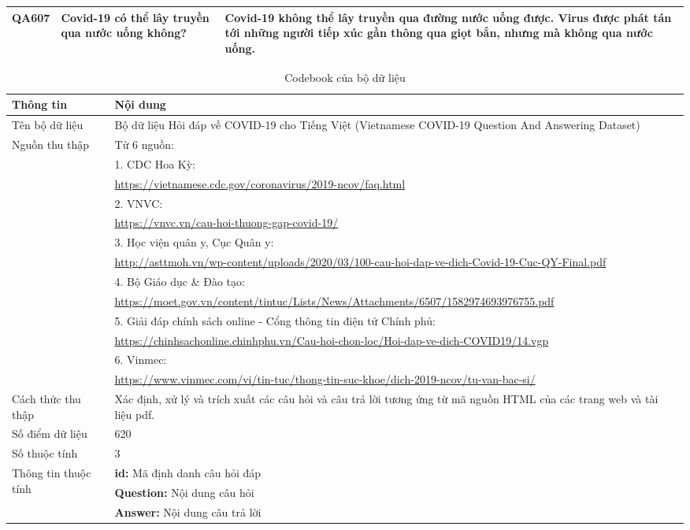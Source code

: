 \documentclass[runningheads]{llncs}
\begin{document}
\begin{table}
\begin{center}
\begin{tabular}{ | p{1.25cm} | p{5cm} | p{5cm} |}
			\hline
			QA607& Covid-19 có thể lây truyền qua nước uống không? &Covid-19 không thể lây truyền qua đường nước uống được. Virus được phát tán tới những người tiếp xúc gần thông qua giọt bắn, nhưng mà không qua nước uống.\\
			\hline
			\end{tabular}
		\end{center}
\end{table}
\begin{table}[H]
	\setlength{\tabcolsep}{0.5em}
	\renewcommand{\arraystretch}{1.4}
	\begin{center}
	\caption{Codebook của bộ dữ liệu}\label{tab5}
		\begin{tabular}{ | p{2.25cm} | p{9.45cm} |} 
			\hline
    		\textbf{Thông tin} & \textbf{Nội dung}\\ 
			\hline
			Tên bộ dữ liệu& Bộ dữ liệu Hỏi đáp về COVID-19 cho Tiếng Việt (Vietnamese COVID-19 Question And Answering Dataset)\\			
			\hline
			\multirow{1}{*}{Nguồn thu thập} &Từ 6 nguồn: \\
										    & 1. CDC Hoa Kỳ:\\& \url{https://vietnamese.cdc.gov/coronavirus/2019-ncov/faq.html}\\
			                                &2. VNVC:\\& \url{https://vnvc.vn/cau-hoi-thuong-gap-covid-19/}\\
											&3. Học viện quân y, Cục Quân y:\\& \url{http://asttmoh.vn/wp-content/uploads/2020/03/100-cau-hoi-dap-ve-dich-Covid-19-Cuc-QY-Final.pdf}\\
											&4. Bộ Giáo dục \& Đào tạo:\\& \url{https://moet.gov.vn/content/tintuc/Lists/News/Attachments/6507/1582974693976755.pdf}\\
											&5. Giải đáp chính sách online - Cổng thông tin điện tử Chính phủ:\\& \url{https://chinhsachonline.chinhphu.vn/Cau-hoi-chon-loc/Hoi-dap-ve-dich-COVID19/14.vgp}\\
											&6. Vinmec:\\& \url{https://www.vinmec.com/vi/tin-tuc/thong-tin-suc-khoe/dich-2019-ncov/tu-van-bac-si/}\\
											
			\hline
			Cách thức thu thập & Xác định, xử lý và trích xuất các câu hỏi và câu trả lời tương ứng từ mã nguồn HTML của các trang web và tài liệu pdf.\\ 
			\hline
			Số điểm dữ liệu & 620\\
			\hline
			Số thuộc tính & 3\\
			\hline
			\multirow{2}{2.25cm}{Thông tin thuộc tính}& \textbf{id:} Mã định danh câu hỏi đáp\\
													  & \textbf{Question:} Nội dung câu hỏi\\
													  & \textbf{Answer:} Nội dung câu trả lời\\
			\hline
			\end{tabular}
		\end{center}
\end{table}
\end{document}
